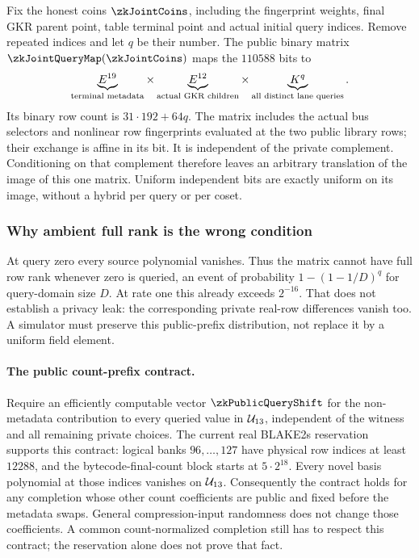 Fix the honest coins $\zkJointCoins$, including the fingerprint weights, final GKR parent point, table terminal point and actual initial query indices. Remove repeated indices and let $q$ be their number. The public binary matrix $\zkJointQueryMap(\zkJointCoins)$ maps the $110588$ bits to
\[
 \underbrace{E^{19}}_{\text{terminal metadata}}
 \times\underbrace{E^{12}}_{\text{actual GKR children}}
 \times\underbrace{K^q}_{\text{all distinct lane queries}}.
\]
Its binary row count is $31\cdot192+64q$. The matrix includes the actual bus selectors and nonlinear row fingerprints evaluated at the two public library rows; their exchange is affine in its bit. It is independent of the private complement. Conditioning on that complement therefore leaves an arbitrary translation of the image of this one matrix. Uniform independent bits are exactly uniform on its image, without a hybrid per query or per coset.

\subsubsection{Why ambient full rank is the wrong condition}

At query zero every source polynomial vanishes. Thus the matrix cannot have full row rank whenever zero is queried, an event of probability $1-(1-1/D)^q$ for query-domain size $D$. At rate one this already exceeds $2^{-16}$. That does not establish a privacy leak: the corresponding private real-row differences vanish too. A simulator must preserve this public-prefix distribution, not replace it by a uniform field element.

\paragraph{The public count-prefix contract.} Require an efficiently computable vector $\zkPublicQueryShift$ for the non-metadata contribution to every queried value in $\mathcal{U}_{13}$, independent of the witness and all remaining private choices. The current real BLAKE2s reservation supports this contract: logical banks $96,\ldots,127$ have physical row indices at least $12288$, and the bytecode-final-count block starts at $5\cdot2^{18}$. Every novel basis polynomial at those indices vanishes on $\mathcal{U}_{13}$. Consequently the contract holds for any completion whose other count coefficients are public and fixed before the metadata swaps. General compression-input randomness does not change those coefficients. A common count-normalized completion still has to respect this contract; the reservation alone does not prove that fact.

